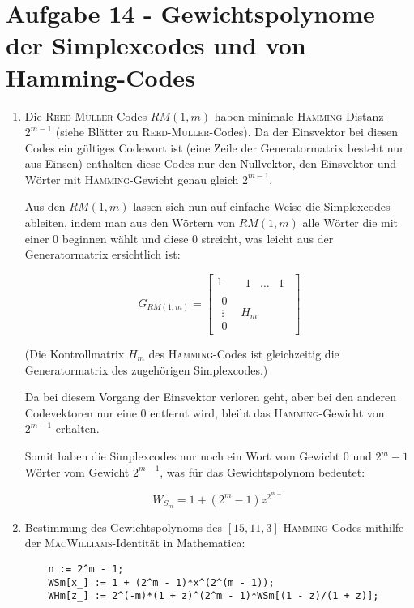 \section*{Aufgabe 14 - Gewichtspolynome der Simplexcodes und von Hamming-Codes}
\begin{enumerate}
\item
	Die \textsc{Reed-Muller}-Codes $RM(1,m)$ haben minimale
	\textsc{Hamming}-Distanz $2^{m-1}$ (siehe Blätter zu
	\textsc{Reed-Muller}-Codes). Da der Einsvektor bei diesen Codes ein
	gültiges Codewort ist (eine Zeile der Generatormatrix besteht nur aus
	Einsen) enthalten diese Codes nur den Nullvektor, den Einsvektor und
	Wörter mit \textsc{Hamming}-Gewicht genau gleich $2^{m-1}$.

	Aus den $RM(1,m)$ lassen sich nun auf einfache Weise die Simplexcodes
	ableiten, indem man aus den Wörtern von $RM(1,m)$ alle Wörter die mit
	einer $0$ beginnen wählt und diese $0$ streicht, was leicht aus der
	Generatormatrix ersichtlich ist:

	\[ G_{RM(1,m)} = \begin{bmatrix}1&\begin{matrix}1&\dots&1\end{matrix}\\
	\begin{matrix}0\\\vdots\\0\end{matrix}&H_{m} \end{bmatrix}\]

	(Die Kontrollmatrix $H_{m}$ des \textsc{Hamming}-Codes ist gleichzeitig
	die Generatormatrix des zugehörigen Simplexcodes.)

	Da bei diesem Vorgang der Einsvektor verloren geht, aber bei den
	anderen Codevektoren nur eine $0$ entfernt wird, bleibt das
	\textsc{Hamming}-Gewicht von $2^{m-1}$ erhalten.

	Somit haben die Simplexcodes nur noch ein Wort vom Gewicht $0$ und
	$2^{m} - 1$ Wörter vom Gewicht $2^{m-1}$, was für das Gewichtspolynom
	bedeutet:

	\[ W_{S_{m}} = 1 + (2^{m} - 1)z^{2^{m-1}} \]
\item
	Bestimmung des Gewichtspolynoms des $[15,11,3]$-\textsc{Hamming}-Codes
	mithilfe der \textsc{MacWilliams}-Identität in Mathematica:
	\lstset{ %
		language=Mathematica,
		basicstyle=\small,
		numbers=left,
		numberstyle=\small,
		numbersep=-9pt
	}
	\begin{lstlisting}
	n := 2^m - 1;
	WSm[x_] := 1 + (2^m - 1)*x^(2^(m - 1));
	WHm[z_] := 2^(-m)*(1 + z)^(2^m - 1)*WSm[(1 - z)/(1 + z)];


\end{lstlisting}
\end{enumerate}

